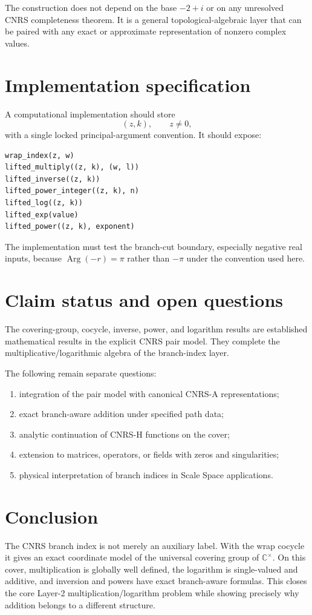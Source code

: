 \documentclass[11pt]{article}
\newcommand{\C}{\mathbb C}
\newcommand{\Argp}{\operatorname{Arg}}
\begin{document}
The construction does not depend on the base $-2+i$ or on any unresolved CNRS completeness theorem.  It is a general topological-algebraic layer that can be paired with any exact or approximate representation of nonzero complex values.

\section{Implementation specification}
A computational implementation should store
\[
(z,k),\qquad z\ne0,
\]
with a single locked principal-argument convention.  It should expose:
\begin{verbatim}
wrap_index(z, w)
lifted_multiply((z, k), (w, l))
lifted_inverse((z, k))
lifted_power_integer((z, k), n)
lifted_log((z, k))
lifted_exp(value)
lifted_power((z, k), exponent)
\end{verbatim}
The implementation must test the branch-cut boundary, especially negative real inputs, because $\Argp(-r)=\pi$ rather than $-\pi$ under the convention used here.

\section{Claim status and open questions}
The covering-group, cocycle, inverse, power, and logarithm results are established mathematical results in the explicit CNRS pair model.  They complete the multiplicative/logarithmic algebra of the branch-index layer.

The following remain separate questions:
\begin{enumerate}
\item integration of the pair model with canonical CNRS-A representations;
\item exact branch-aware addition under specified path data;
\item analytic continuation of CNRS-H functions on the cover;
\item extension to matrices, operators, or fields with zeros and singularities;
\item physical interpretation of branch indices in Scale Space applications.
\end{enumerate}

\section*{Conclusion}
The CNRS branch index is not merely an auxiliary label.  With the wrap cocycle it gives an exact coordinate model of the universal covering group of $\C^{\times}$.  On this cover, multiplication is globally well defined, the logarithm is single-valued and additive, and inversion and powers have exact branch-aware formulas.  This closes the core Layer-2 multiplication/logarithm problem while showing precisely why addition belongs to a different structure.
\end{document}
